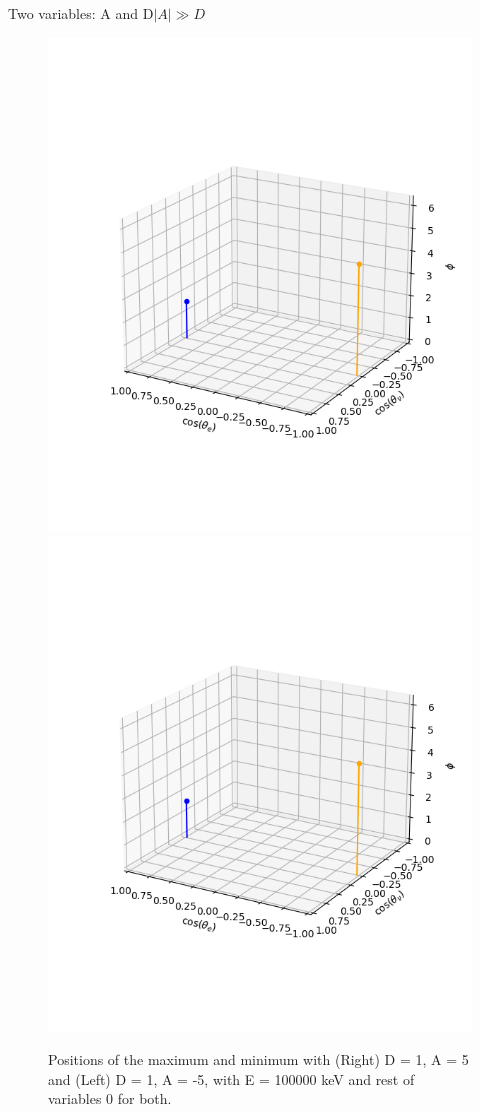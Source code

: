 \documentclass{beamer}
\begin{document}
\begin{frame}{Two variables: A and D}{$|A|\gg D$}
	\begin{figure}
		\centering
		\includegraphics[width=0.4\paperwidth]{plots/posD_xlposA_max_min}
		\includegraphics[width=0.4\paperwidth]{plots/posD_xlposA_max_min}
		\caption{Positions of the maximum and minimum with (Right) D = 1, A = 5 and (Left) D = 1, A = -5, with E = 100000 keV and rest of variables 0 for both.}
	\end{figure}
\end{frame}
\end{document}
